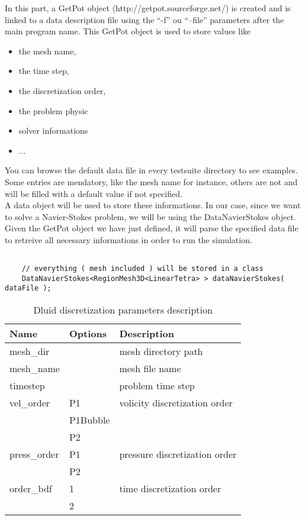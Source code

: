 \noident In this part, a GetPot object (http://getpot.sourceforge.net/) is created
and is linked to a data description file using  the ``-f'' ou ``--file'' parameters after
the main program name. This GetPot object is used to store values like
\begin{itemize}
\item the mesh name,
\item the time step,
\item the discretization order,
\item the problem physic
\item solver informations
\item ...
\end{itemize}
You can browse the default data file in every testsuite directory to see examples.
Some entries are mendatory, like the mesh name for instance, others are not and will be
filled with a default value if not specified.\\
A data object will be used to store these informations. In our case, since we want to
solve a Navier-Stokes problem, we will be using the DataNavierStokes object.
Given the GetPot object we have just defined, it will parse the specified data file
to retreive all necessary informations in order to run the simulation.

\begin{verbatim}

    // everything ( mesh included ) will be stored in a class
    DataNavierStokes<RegionMesh3D<LinearTetra> > dataNavierStokes( dataFile );

\end{verbatim}

\begin{table}
\begin{center}
\begin{tabular}{|l|l|l|}
\hline
Name & Options & Description \\
\hline \hline
mesh\_dir & & mesh directory path \\ \hline
mesh\_name & & mesh file name \\ \hline
timestep & & problem time step \\ \hline
vel\_order & P1 & volicity discretization order \\ \
& P1Bubble & \\
& P2 & \\ \hline
press\_order & P1 & pressure discretization order \\
& P2 & \\ \hline
order\_bdf & 1 & time discretization order \\
& 2 & \\ \hline
\end{tabular}
\end{center}
\caption{ Dluid discretization parameters description
}
\label{table-bcparams}
\end{table}


